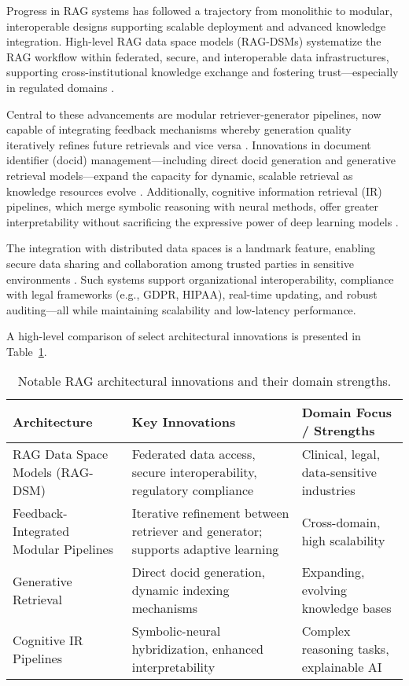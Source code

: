 \documentclass[11pt]{article}
\begin{document}
Progress in RAG systems has followed a trajectory from monolithic to modular, interoperable designs supporting scalable deployment and advanced knowledge integration. High-level RAG data space models (RAG-DSMs) systematize the RAG workflow within federated, secure, and interoperable data infrastructures, supporting cross-institutional knowledge exchange and fostering trust—especially in regulated domains \cite{ref64}.

Central to these advancements are modular retriever-generator pipelines, now capable of integrating feedback mechanisms whereby generation quality iteratively refines future retrievals and vice versa \cite{ref4,ref5,ref14,ref15,ref22,ref28,ref33,ref36,ref37,ref38,ref47,ref54,ref63,ref64}. Innovations in document identifier (docid) management—including direct docid generation and generative retrieval models—expand the capacity for dynamic, scalable retrieval as knowledge resources evolve \cite{ref45,ref52,ref54}. Additionally, cognitive information retrieval (IR) pipelines, which merge symbolic reasoning with neural methods, offer greater interpretability without sacrificing the expressive power of deep learning models \cite{ref31,ref37,ref47}.

The integration with distributed data spaces is a landmark feature, enabling secure data sharing and collaboration among trusted parties in sensitive environments \cite{ref64}. Such systems support organizational interoperability, compliance with legal frameworks (e.g., GDPR, HIPAA), real-time updating, and robust auditing—all while maintaining scalability and low-latency performance.

A high-level comparison of select architectural innovations is presented in Table~\ref{tab:rag_architectures}.

\begin{table}[htbp]
\centering
\begin{tabular}{|p{4cm}|p{4cm}|p{4cm}|}
\hline
\textbf{Architecture} & \textbf{Key Innovations} & \textbf{Domain Focus / Strengths} \\
\hline
RAG Data Space Models (RAG-DSM) & Federated data access, secure interoperability, regulatory compliance & Clinical, legal, data-sensitive industries \\
\hline
Feedback-Integrated Modular Pipelines & Iterative refinement between retriever and generator; supports adaptive learning & Cross-domain, high scalability \\
\hline
Generative Retrieval & Direct docid generation, dynamic indexing mechanisms & Expanding, evolving knowledge bases \\
\hline
Cognitive IR Pipelines & Symbolic-neural hybridization, enhanced interpretability & Complex reasoning tasks, explainable AI \\
\hline
\end{tabular}
\caption{Notable RAG architectural innovations and their domain strengths.}
\label{tab:rag_architectures}
\end{table}
\end{document}
